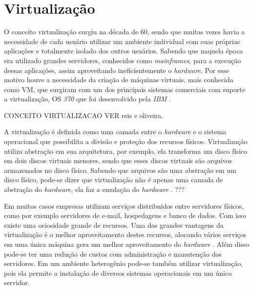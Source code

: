 \chapter{Virtualização}
\label{cap:virtualizacao}

O conceito virtualização surgiu na década de 60, sendo que muitas vezes havia a necessidade de cada usuário utilizar um ambiente individual 
com suas próprias aplicações e totalmente isolado dos outros usuários. Sabendo que naquela época era utilizado grandes servidores, conhecidos
como \textit{mainframes}, para a execução dessas aplicações, assim aproveitando ineficientemente o \textit{hardware}. Por esse motivo houve
a necessidade da criação de máquinas virtuais, mais conhecida como \ac{VM}, que surgiram com um dos principais sistemas comerciais com
suporte a virtualização, \ac{OS} \textit{370} que foi desenvolvido pela \textit{IBM} \cite{laureano2008}.

CONCEITO VIRTUALIZACAO VER reis e oliveira.

A virtualização é definida como uma camada entre o \textit{hardware} e o sistema operacional que possibilita a divisão e proteção
dos recursos físicos. Virtualização utiliza abstração em sua arquitetura, por exemplo, ela transforma um disco físico em dois discos 
virtuais menores, sendo que esses discos virtuais são arquivos armazenados no disco físico. Sabendo que arquivos são uma abstração
em um disco físico, pode-se dizer que virtualização não é apenas uma camada de abstração do \textit{hardware}, ela faz a emulação 
do \textit{hardware} \cite{smithenair2005}. ???

Em muitos casos empresas utilizam serviços distribuídos entre servidores físicos, como por exemplo servidores de e-mail, hospedagens e 
banco de dados. Com isso existe uma ociosidade grande de recursos. Uma das grandes vantagens da virtualização é o melhor aproveitamento
destes recursos, alocando vários serviços em uma única máquina gera um melhor aproveitamento do \textit{hardware} \cite{moreira2006}.
Além disso pode-se ter uma redução de custos com administração e manutenção dos servidores. Em um ambiente heterogênio pode-se também
utilizar virtualização, pois ela permite a instalação de diversos sistemas operacionais em um único servidor.

